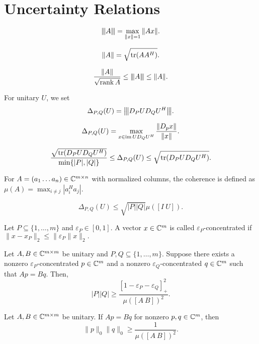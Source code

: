 \section{Uncertainty Relations}
\begin{boxdefinition}
    $${\left\vert\kern-0.25ex\left\vert\kern-0.25ex\left\vert A \right\vert\kern-0.25ex\right\vert\kern-0.25ex\right\vert}=\max_{\|x\|=1}\|Ax\|.$$
\end{boxdefinition}

\begin{boxdefinition}
    $$\|A\|=\sqrt{\operatorname*{tr} (AA^H)}.$$
\end{boxdefinition}

\begin{boxtheorem}
    $$\frac{\| A\|}{\sqrt{\operatorname*{rank} A}}\leq{\left\vert\kern-0.25ex\left\vert\kern-0.25ex\left\vert A \right\vert\kern-0.25ex\right\vert\kern-0.25ex\right\vert}\leq\|A\|.$$
\end{boxtheorem}

\begin{boxdefinition}
    For unitary $U$, we set $$\Delta_{P,Q}(U)={\left\vert\kern-0.25ex\left\vert\kern-0.25ex\left\vert D_PUD_QU^H \right\vert\kern-0.25ex\right\vert\kern-0.25ex\right\vert}.$$
\end{boxdefinition}

\begin{boxtheorem}
    $$\Delta_{P,Q}(U)=\max_{x\in\operatorname*{im} UD_QU^H}\frac{\|D_px\|}{\|x\|}.$$
\end{boxtheorem}

\begin{boxtheorem}
    \begin{align*}
        \frac{\sqrt{\operatorname*{tr}(D_PUD_QU^H)}}{\min\{|P|,|Q|\}}\leq\Delta_{P,Q}(U)
        \leq \sqrt{\operatorname*{tr}(D_PUD_QU^H)}.        
    \end{align*}
\end{boxtheorem}

\begin{boxdefinition}[Coherence]
    For $A=(a_1\dots a_n)\in \mathbb{C}^{m\times n}$ with normalized columns,
    the coherence is defined as $\mu(A)=\max_{i\neq j}|a_i^Ha_j|$.
\end{boxdefinition}

\begin{boxtheorem}
    $$\Delta_{P,Q}(U)\leq \sqrt{|P||Q|}\mu([I\ U]).$$
\end{boxtheorem}

\begin{boxdefinition}
    Let $P\subseteq \{1,\dots,m\}$ and $\varepsilon_P\in[0,1]$. A
    vector $x\in\mathbb{C}^m$ is called $\varepsilon_P$-concentrated
    if $\|x-x_P\|_2\leq\|\varepsilon_P\|x\|_2.$
\end{boxdefinition}

\begin{boxtheorem}
    Let $A,B\in\mathbb{C}^{m\times m}$ be unitary and $P,Q\subseteq \{1,\dots,m\}$.
    Suppose there exists a nonzero $\varepsilon_P$-concentrated 
    $p\in\mathbb{C}^m$ and a nonzero $\varepsilon_Q$-concentrated $q\in\mathbb{C}^m$
    such that $Ap=Bq.$ Then, 
    $$
    |P||Q|\geq \frac{[1-\varepsilon_P-\varepsilon_Q]_+^2}{\mu([A\ B])^2}
    .$$
\end{boxtheorem}

\begin{boxtheorem}
    Let $A,B\in\mathbb{C}^{m\times m}$ be unitary. If $Ap=Bq$ for nonzero
    $p,q\in\mathbb{C}^m$, then 
    $$
    \|p\|_0\|q\|_0\geq\frac{1}{\mu([A\ B])^2}.
    $$
\end{boxtheorem}
